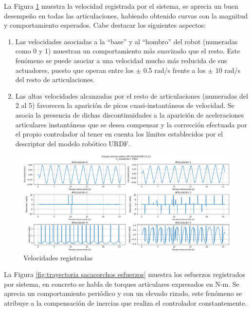 La Figura \ref{fig:trayectoria sacacorchos velocidades} muestra la velocidad registrada por el sistema, se aprecia un buen desempeño en todas las articulaciones, habiendo obtenido curvas con la magnitud y comportamiento esperados. Cabe destacar los siguientes aspectos:
\begin{enumerate}
    \item Las velocidades asociadas a la \enquote{base} y al \enquote{hombro} del robot (numeradas como 0 y 1) muestran un comportamiento más suavizado que el resto. Este fenómeno se puede asociar a una velocidad mucho más reducida de sus actuadores, puesto que operan entre los $\pm$ 0.5 rad/s frente a los $\pm$ 10 rad/s del resto de articulaciones.
    \item Las altas velocidades alcanzadas por el resto de articulaciones (numeradas del 2 al 5)  favorecen la aparición de picos cuasi-instantáneos de velocidad. Se asocia la presencia de dichas discontinuidades a la aparición de aceleraciones articulares instantáneas que se desea compensar y la corrección efectuada por el propio controlador al tener en cuenta los límites establecidos por el descriptor del modelo robótico \acrshort{URDF}.
\end{enumerate}

\begin{figure}[h!]
    \centering
    \includegraphics[scale=0.4]{figuras/ensayo_lectura_datos/velocidad_sacacorchos.png}
    \caption{Velocidades registradas}
    \label{fig:trayectoria sacacorchos velocidades}
\end{figure}

La Figura \ref{fig:trayectoria sacacorchos esfuerzos} muestra los esfuerzos registrados por sistema, en concreto se habla de torques articulares expresados en N-m. Se aprecia un comportamiento periódico y con un elevado rizado, este fenómeno se atribuye a la compensación de inercias que realiza el controlador constantemente.

